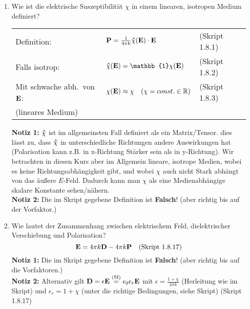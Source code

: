 \begin{enumerate}
  \item Wie ist die elektrische Suszeptibilität $\chi$ in einem 
        linearen, isotropen Medium definiert?
        \begin{center}
        \begin{tabular}{lll}
          Definition:             
          & $\vb P = \frac{1}{4\pi k} 
            \vu \chi(\vb E)\cdot \vb E\quad$
          & (Skript 1.8.1) \\
          Falls isotrop: 
          & $\vu\chi(\vb E)=
            \mathbb{1}\chi(\vb E)$
          & (Skript 1.8.2) \\
          Mit schwache abh.\ von $\vb E$:
          & $\chi(\vb E)\approx\chi
          \quad(\chi=const.\in\mathbb{R})$
            & (Skript 1.8.3) \\
          (lineares Medium)
        \end{tabular}
        \end{center}
        \textbf{Notiz 1:} $\vu \chi$ ist im allgemeinsten Fall 
        definiert als ein Matrix/Tensor.
        dies lässt zu, dass $\vu \chi$ in unterschiedliche Richtungen
        andere Auswirkungen hat (Polarisation kann z.B. in x-Richtung
        Stärker sein als in y-Richtung). Wir betrachten in diesen Kurs 
        aber im Allgemein
        lineare, isotrope Medien, wobei es keine Richtungsabhängigkeit
        gibt, und wobei $\chi$ auch nicht Stark abhängt von das äußere
        $E$-Feld. Dadurch kann
        man $\chi$ als eine Medienabhängige skalare Konstante 
        sehen/nähern.\\
        \textbf{Notiz 2:} Die im Skript gegebene Definition ist 
        \textbf{Falsch}! (aber richtig bis auf der Vorfaktor.)\\

  \item Wie lautet der Zusammenhang zwischen elektrischem Feld, 
        dielektrischer Verschiebung und Polarisation?
        $$\vb E= 4\pi k\vb D - 4\pi k\vb P \quad\text{(Skript 1.8.17)}$$
        \textbf{Notiz 1:} Die im Skript gegebene Definition ist 
        \textbf{Falsch}! (aber richtig bis auf die Vorfaktoren.)\\
        \textbf{Notiz 2:} Alternativ gilt $\vb D=\epsilon \vb E
        \stackrel{\text{(SI)}}=\epsilon_0\epsilon_r \vb E$ mit
        $\epsilon=\frac{1+\chi}{4\pi k}$ (Herleitung wie im Skript) und
        $\epsilon_r=1+\chi$
        (unter die richtige Bedingungen, siehe Skript) (Skript 1.8.17)\\


\end{enumerate}
